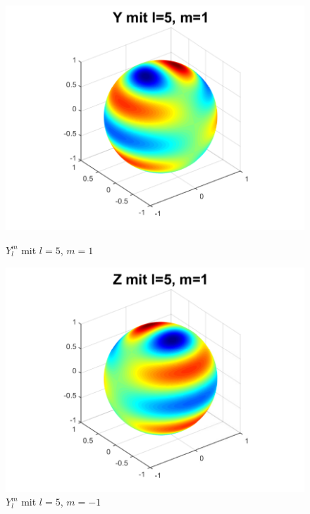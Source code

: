 \begin{figure}
\begin{minipage}[hbt]{0.4\textwidth}
\includegraphics[width=1\textwidth]{chapters/images/ylm/a_5_1.pdf}
\caption{$Y^m_l$ mit $l=5$, $m=1$}
\label{skript:ylm l=5 m=1}
\end{minipage}
\hfill
\begin{minipage}[hbt]{0.4\textwidth}
\centering
\includegraphics[width=1\textwidth]{chapters/images/ylm/b_5_1.pdf}
\caption{$Y^m_l$ mit $l=5$, $m=-1$}
\label{skript:zlm l=5 m=1}
\end{minipage}
\begin{minipage}[hbt]{0.4\textwidth}
\centering

\end{minipage}
\end{figure}
